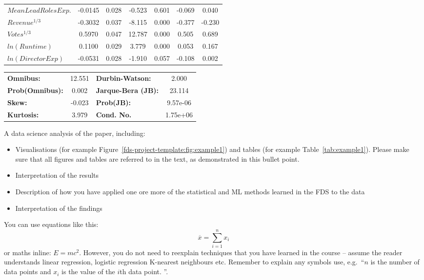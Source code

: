 \begin{center}
\begin{tabular}{lcccccc}
\textbf{$Mean Lead Roles Exp.$} &      -0.0145  &        0.028     &    -0.523  &         0.601        &       -0.069    &        0.040     \\
\textbf{$Revenue^{1/3}$}        &      -0.3032  &        0.037     &    -8.115  &         0.000        &       -0.377    &       -0.230     \\
\textbf{$Votes^{1/3}$}          &       0.5970  &        0.047     &    12.787  &         0.000        &        0.505    &        0.689     \\
\textbf{$ln(Runtime)$}          &       0.1100  &        0.029     &     3.779  &         0.000        &        0.053    &        0.167     \\
\textbf{$ln(Director Exp)$}     &      -0.0531  &        0.028     &    -1.910  &         0.057        &       -0.108    &        0.002     \\
\bottomrule
\end{tabular}
\begin{tabular}{lclc}
\textbf{Omnibus:}       & 12.551 & \textbf{  Durbin-Watson:     } &    2.000  \\
\textbf{Prob(Omnibus):} &  0.002 & \textbf{  Jarque-Bera (JB):  } &   23.114  \\
\textbf{Skew:}          & -0.023 & \textbf{  Prob(JB):          } & 9.57e-06  \\
\textbf{Kurtosis:}      &  3.979 & \textbf{  Cond. No.          } & 1.75e+06  \\
\bottomrule
\end{tabular}
\end{center}
        
    A data science analysis of the paper, including: \begin{itemize} \item
        Visualisations (for example Figure~\ref{fds-project-template:fig:example1}) and
        tables (for example Table~\ref{tab:example1}).
    Please make sure that all figures and tables are referred to in the text, as
        demonstrated in this bullet point.
    \item Interpretation of the results
    \item Description of how you have applied one ore more of the
    statistical and ML methods learned in the FDS to the data
    \item Interpretation of the findings
    \end{itemize}

    You can use equations like this:
    \begin{equation}
        \label{fds-project-template:eq:1} \overline{x} = \sum_{i=1}^n x_i
    \end{equation}
    or maths inline: $E=mc^2$.
    However, you do not need to reexplain techniques that you have learned in the
        course -- assume the reader understands linear regression, logistic regression
        K-nearest neighbours etc. Remember to explain any symbols use, e.g.~``$n$ is
        the number of data points and $x_i$ is the value of the $i$th data point.
    ''.